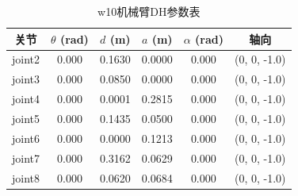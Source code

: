 \begin{table}[h]
\centering
\caption{w10机械臂DH参数表}
\begin{tabular}{|c|c|c|c|c|c|}
\hline
关节 & $\theta$ (rad) & $d$ (m) & $a$ (m) & $\alpha$ (rad) & 轴向 \\
\hline
joint2 & 0.000 & 0.1630 & 0.0000 & 0.000 & (0, 0, -1.0) \\
joint3 & 0.000 & 0.0850 & 0.0000 & 0.000 & (0, 0, -1.0) \\
joint4 & 0.000 & 0.0001 & 0.2815 & 0.000 & (0, 0, -1.0) \\
joint5 & 0.000 & 0.1435 & 0.0500 & 0.000 & (0, 0, -1.0) \\
joint6 & 0.000 & 0.0000 & 0.1213 & 0.000 & (0, 0, -1.0) \\
joint7 & 0.000 & 0.3162 & 0.0629 & 0.000 & (0, 0, -1.0) \\
joint8 & 0.000 & 0.0620 & 0.0684 & 0.000 & (0, 0, -1.0) \\
\hline
\end{tabular}
\end{table}

